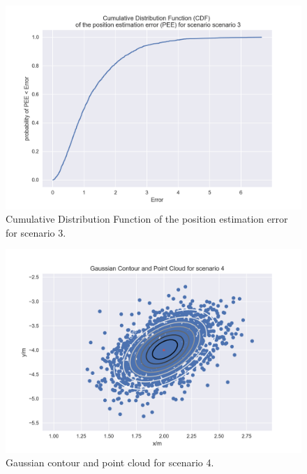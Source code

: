 \begin{figure}[H]
	\centering
\includegraphics[width=14cm]{cdf3.png}
	\caption{Cumulative Distribution Function of the position estimation error for scenario 3.}
	\label{fig1:cdf3}
\end{figure}

\begin{figure}[H]
	\centering
\includegraphics[width=14cm]{gauss4.png}
	\caption{Gaussian contour and point cloud for scenario 4.}
	\label{fig1:gpc4}
\end{figure}

